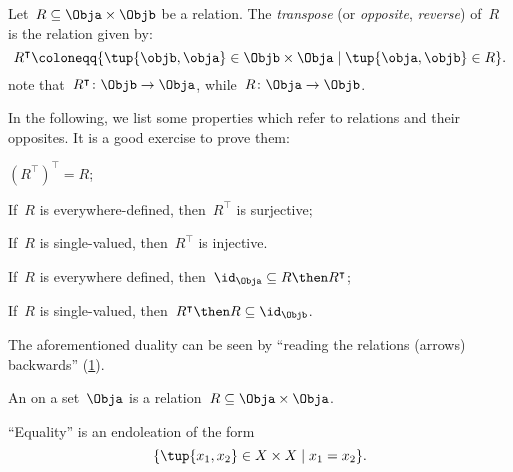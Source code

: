 \begin{definition}
    \label{def:relation-transpose}
    Let~$R\subseteq \Obja\times \Objb$ be a relation. The \emph{transpose} (or \emph{opposite}, \emph{reverse}) of~$R$ is the relation given by:
    \begin{equation*}
        R^\intercal \coloneqq \{\tup{\objb,\obja}\in \Objb\times \Obja \mid \tup{\obja,\objb}\in R \}.
    \end{equation*}
    note that~$R^\intercal\colon \Objb\to \Obja$, while~$R\colon \Obja\to \Objb$.
\end{definition}
\begin{remark}
    In the following, we list some properties which refer to relations and their opposites. It is a good exercise to prove them:
    \begin{compactitem}
        \item $\left( R^\intercal\right)^\intercal =R$;
        \item If~$R$ is everywhere-defined, then~$R^\intercal$ is surjective;
        \item If~$R$ is single-valued, then~$R^\intercal$ is injective.
        \item If~$R$ is everywhere defined, then~$\id_\Obja\subseteq R\then R^\intercal$;
        \item If~$R$ is single-valued, then~$R^\intercal\then R\subseteq \id_\Objb$.
    \end{compactitem}
\end{remark}

\begin{remark}
    The aforementioned duality can be seen by ``reading the relations (arrows) backwards'' (\cref{fig:rel_transpose}).
\end{remark}

\begin{figure}[h!]
    \centering
    \caption{\label{fig:rel_transpose}}
\end{figure}

\begin{definition}[Endorelation]
    \label{def:endorelation}
    An \emph{} on a set~$\Obja$ is a relation~$R\subseteq \Obja\times \Obja$.
\end{definition}

\begin{example}
    ``Equality'' is an endoleation of the form
    \begin{equation*}
        \{\tup{x_1,x_2}\in X\times X\mid x_1=x_2\}.
    \end{equation*}
\end{example}

